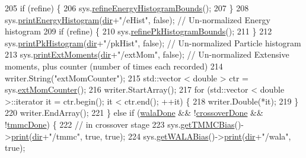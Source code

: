 \begin{DoxyCode}
205         \textcolor{keywordflow}{if} (refine) \{
206             sys.\hyperlink{classsim_system_afe05cba714a032b445cfb1a529547833}{refineEnergyHistogramBounds}();
207         \}
208         sys.\hyperlink{classsim_system_a6ef1ba3e08ec44d865436e272cdebc9b}{printEnergyHistogram}(\hyperlink{classcheckpoint_a0e0f999ee8e0b09541e9131baa8a591d}{dir}+\textcolor{stringliteral}{"/eHist"}, \textcolor{keyword}{false}); \textcolor{comment}{// Un-normalized Energy
       histogram}
209         \textcolor{keywordflow}{if} (refine) \{
210             sys.\hyperlink{classsim_system_a1e462fcb63389d59419ff6135b2d802e}{refinePkHistogramBounds}();
211         \}
212         sys.\hyperlink{classsim_system_ac29bdd6f7fa6f9526b7eafcf658d70d8}{printPkHistogram}(\hyperlink{classcheckpoint_a0e0f999ee8e0b09541e9131baa8a591d}{dir}+\textcolor{stringliteral}{"/pkHist"}, \textcolor{keyword}{false}); \textcolor{comment}{// Un-normalized Particle histogram}
213         sys.\hyperlink{classsim_system_a2818b2f0ff79782d5443ca0f191564f8}{printExtMoments}(\hyperlink{classcheckpoint_a0e0f999ee8e0b09541e9131baa8a591d}{dir}+\textcolor{stringliteral}{"/extMom"}, \textcolor{keyword}{false}); \textcolor{comment}{// Un-normalized Extensive moments,
       plus counter (number of times each recorded)}
214         writer.String(\textcolor{stringliteral}{"extMomCounter"});
215         std::vector < double > ctr = sys.\hyperlink{classsim_system_a1744c4c22603662081d75985bc30b754}{extMomCounter}();
216         writer.StartArray();
217         \textcolor{keywordflow}{for} (std::vector < double >::iterator it = ctr.begin(); it < ctr.end(); ++it) \{
218             writer.Double(*it);
219         \}
220         writer.EndArray();
221     \} \textcolor{keywordflow}{else} \textcolor{keywordflow}{if} (\hyperlink{classcheckpoint_aab066479e2ca6656d0031dd46a2fc1a5}{walaDone} && !\hyperlink{classcheckpoint_a4f13612ea6d376bb327295bfce3a70c5}{crossoverDone} && !\hyperlink{classcheckpoint_acbe0c62aa82735741a9f396827966823}{tmmcDone}) \{
222         \textcolor{comment}{// in crossover stage}
223         sys.\hyperlink{classsim_system_aa31d40c91cb50f143a9613d362798887}{getTMMCBias}()->\hyperlink{classtmmc_ad49e147dc88b3e1c2975269598f94327}{print}(\hyperlink{classcheckpoint_a0e0f999ee8e0b09541e9131baa8a591d}{dir}+\textcolor{stringliteral}{"/tmmc"}, \textcolor{keyword}{true}, \textcolor{keyword}{true});
224         sys.\hyperlink{classsim_system_a7cb5049de8b0988349e89e30e4000407}{getWALABias}()->\hyperlink{classwala_a65569289fac85d0da9c336e17c9d809a}{print}(\hyperlink{classcheckpoint_a0e0f999ee8e0b09541e9131baa8a591d}{dir}+\textcolor{stringliteral}{"/wala"}, \textcolor{keyword}{true});

\end{DoxyCode}
